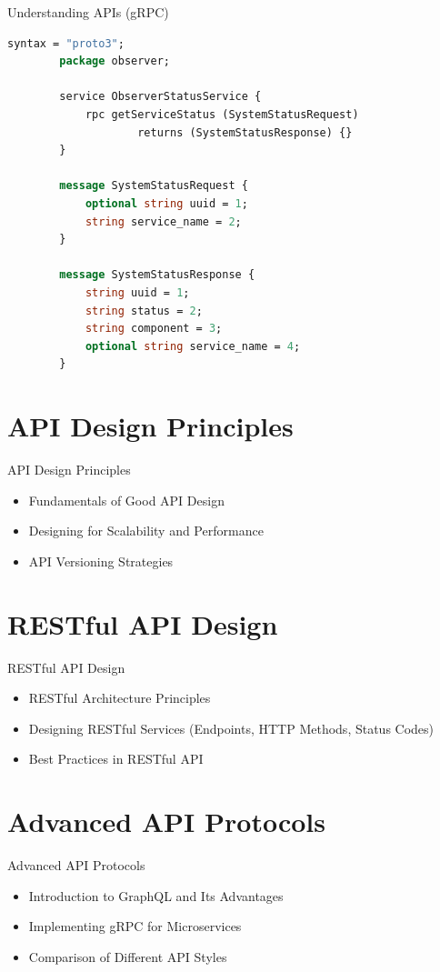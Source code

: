 \documentclass{beamer}
\begin{document}
\begin{frame}[fragile,t]{Understanding APIs \small (gRPC)}  
	
	\scriptsize
      \begin{lstlisting}[language=protobuf]
		syntax = "proto3";
		package observer;

		service ObserverStatusService {
    		rpc getServiceStatus (SystemStatusRequest) 
    				returns (SystemStatusResponse) {}
		}

		message SystemStatusRequest {
    		optional string uuid = 1;
    		string service_name = 2;
		}

		message SystemStatusResponse {
    		string uuid = 1;
    		string status = 2;
    		string component = 3;
    		optional string service_name = 4;
		}
      \end{lstlisting}
  
\end{frame}

 
 
\section{API Design Principles}
\begin{frame}{API Design Principles}
  \begin{itemize}
    \item Fundamentals of Good API Design
    \item Designing for Scalability and Performance
    \item API Versioning Strategies
  \end{itemize}
\end{frame}

\section{RESTful API Design}
\begin{frame}{RESTful API Design}
  \begin{itemize}
    \item RESTful Architecture Principles
    \item Designing RESTful Services (Endpoints, HTTP Methods, Status Codes)
    \item Best Practices in RESTful API
  \end{itemize}
\end{frame}



\section{Advanced API Protocols}
\begin{frame}{Advanced API Protocols}
  \begin{itemize}
    \item Introduction to GraphQL and Its Advantages
    \item Implementing gRPC for Microservices
    \item Comparison of Different API Styles
  \end{itemize}
\end{frame}
\end{document}
